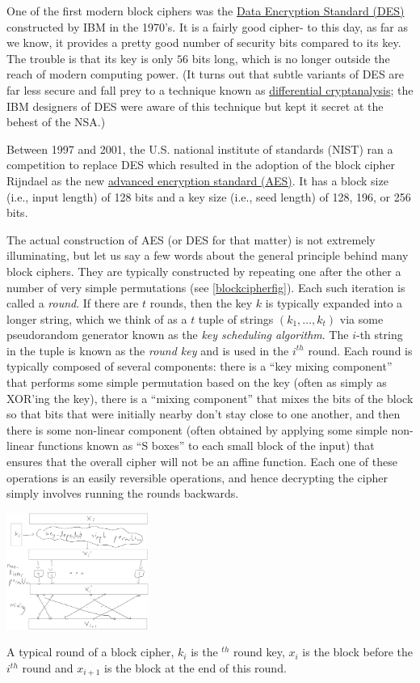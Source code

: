 One of the first modern block ciphers was the
\href{https://goo.gl/XiCvjs}{Data Encryption Standard (DES)} constructed
by IBM in the 1970's. It is a fairly good cipher- to this day, as far as
we know, it provides a pretty good number of security bits compared to
its key. The trouble is that its key is only \(56\) bits long, which is
no longer outside the reach of modern computing power. (It turns out
that subtle variants of DES are far less secure and fall prey to a
technique known as \href{https://goo.gl/GAvbh8}{differential
cryptanalysis}; the IBM designers of DES were aware of this technique
but kept it secret at the behest of the NSA.)

Between 1997 and 2001, the U.S. national institute of standards (NIST)
ran a competition to replace DES which resulted in the adoption of the
block cipher Rijndael as the new \href{https://goo.gl/1HnqFb}{advanced
encryption standard (AES)}. It has a block size (i.e., input length) of
128 bits and a key size (i.e., seed length) of 128, 196, or 256 bits.

The actual construction of AES (or DES for that matter) is not extremely
illuminating, but let us say a few words about the general principle
behind many block ciphers. They are typically constructed by repeating
one after the other a number of very simple permutations (see
\cref{blockcipherfig}). Each such iteration is called a \emph{round}. If
there are \(t\) rounds, then the key \(k\) is typically expanded into a
longer string, which we think of as a \(t\) tuple of strings
\((k_1,\ldots,k_t)\) via some pseudorandom generator known as the
\emph{key scheduling algorithm}. The \(i\)-th string in the tuple is
known as the \emph{round key} and is used in the \(i^{th}\) round. Each
round is typically composed of several components: there is a ``key
mixing component'' that performs some simple permutation based on the
key (often as simply as XOR'ing the key), there is a ``mixing
component'' that mixes the bits of the block so that bits that were
initially nearby don't stay close to one another, and then there is some
non-linear component (often obtained by applying some simple non-linear
functions known as ``S boxes'' to each small block of the input) that
ensures that the overall cipher will not be an affine function. Each one
of these operations is an easily reversible operations, and hence
decrypting the cipher simply involves running the rounds backwards.


\begin{marginfigure}
\centering
\includegraphics[width=\linewidth, height=1.5in, keepaspectratio]{../figure/block-cipher-round.jpg}
\caption{A typical round of a block cipher, \(k_i\) is the \(^{th}\)
round key, \(x_i\) is the block before the \(i^{th}\) round and
\(x_{i+1}\) is the block at the end of this round.}
\label{blockcipherfig}
\end{marginfigure}

